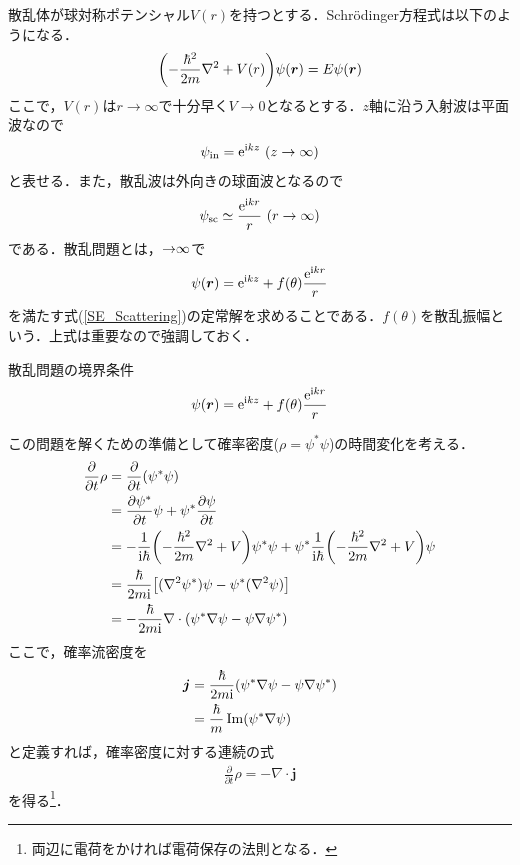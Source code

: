 \documentclass{report}
\begin{document}
  散乱体が球対称ポテンシャル$V(r)$を持つとする．Schrödinger方程式は以下のようになる．
  \begin{align}
    \label{SE_Scattering}
    \qty(-\frac{\hbar^2}{2m}\nabla^2 + V(r))\psi(\bm{r}) = E \psi(\bm{r})
  \end{align}
  ここで，$V(r)$は$r \to \infty$で十分早く$V \to 0$となるとする．$z$軸に沿う入射波は平面波なので
  \begin{align}
    \psi_{\mathrm{in}} = \mathrm{e}^{\mathrm{i} k z}\ (z \to \infty)
  \end{align}
  と表せる．また，散乱波は外向きの球面波となるので
  \begin{align}
    \psi_{\mathrm{sc}} \simeq \frac{\mathrm{e}^{\mathrm{i} kr}}{r}\ (r \to \infty)
  \end{align}
  である．散乱問題とは，$\mathrm{\to} \infty$で
  \begin{align}
    \psi(\bm{r}) = \mathrm{e}^{\mathrm{i} kz} + f(\theta) \frac{\mathrm{e}^{\mathrm{i} kr}}{r}
  \end{align}
  を満たす式(\ref{SE_Scattering})の定常解を求めることである．$f(\theta)$を散乱振幅という．上式は重要なので強調しておく．
  \begin{itembox}[l]{散乱問題の境界条件}
    \begin{equation}
      \psi(\bm{r}) = \mathrm{e}^{\mathrm{i} kz} + f(\theta) \frac{\mathrm{e}^{\mathrm{i} kr}}{r}
    \end{equation}
  \end{itembox}

  この問題を解くための準備として確率密度($\rho = \psi^{*} \psi$)の時間変化を考える．
  \begin{align}
    \frac{\partial}{\partial t}\rho &= \frac{\partial}{\partial t}(\psi^{*}\psi)\\
    &= \frac{\partial \psi^{*}}{\partial t}\psi + \psi^{*}\frac{\partial \psi}{\partial t}\\
    &= -\frac{1}{\mathrm{i}\hbar}\qty(-\frac{\hbar^2}{2m}\nabla^2 + V)\psi^{*}\psi + \psi^{*}\frac{1}{\mathrm{i}\hbar}\qty(-\frac{\hbar^2}{2m}\nabla^2 + V)\psi\\
    &= \frac{\hbar}{2m\mathrm{i}}\qty[(\nabla^2 \psi^{*})\psi - \psi^{*}(\nabla^2\psi)]\\
    &= -\frac{\hbar}{2m\mathrm{i}}\nabla \cdot (\psi^{*}\nabla \psi - \psi \nabla \psi^{*})
  \end{align}
  ここで，確率流密度を
  \begin{align}
    \bm{j} &= \frac{\hbar}{2m\mathrm{i}} (\psi^{*}\nabla \psi - \psi \nabla \psi^{*})\\
    &= \frac{\hbar}{m}\Im (\psi^{*}\nabla\psi)
  \end{align}
  と定義すれば，確率密度に対する連続の式
  \begin{align}
    \frac{\partial}{\partial t} \rho = -\nabla \cdot \bm{j}
  \end{align}
  を得る\footnote{
   両辺に電荷をかければ電荷保存の法則となる． 
  }．
\end{document}
